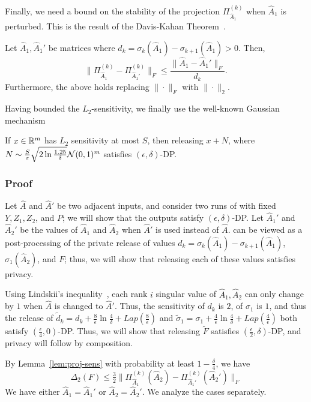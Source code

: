 Finally, we need a bound on the stability of the projection $\Pi_{\hat{A}_1}^{(k)}$ when $\hat{A}_1$ is perturbed. This is the result of the Davis-Kahan Theorem~\citep{bhatia1997}.
\begin{thm}\label{thm:davis-kahan}
Let $\hat{A}_1, \hat{A}_1'$ be matrices where $d_k= \sigma_k(\hat{A}_1) - \sigma_{k+1}(\hat{A}_1) > 0$. Then, 
\[
    \|\Pi_{\hat{A}_1}^{(k)} - \Pi_{\hat{A}_1'}^{(k)}\|_F \leq \frac{\|\hat{A}_1 - \hat{A}_1'\|_F}{d_k}.
\]
Furthermore, the above holds replacing $\|\cdot\|_F$ with $\|\cdot \|_2$.
\end{thm}

Having bounded the $L_2$-sensitivity, we finally use the well-known Gaussian mechanism~\citep{dwork2014algorithmic}
\begin{thm}\label{thm:gauss-mech}
    If $x \in \mathbb{R}^m$ has $L_2$ sensitivity at most $S$, then releasing $x + N$, where $N \sim \frac{S}{\varepsilon} \sqrt{2 \ln \frac{1.25}{\delta}}\mathcal{N}(0,1)^{m}$ satisfies $(\epsilon, \delta)$-DP.
\end{thm}

\subsubsection{Proof}
Let $\hat{A}$ and $\hat{A}'$ be two adjacent inputs, and consider two runs of \dpcom{} with fixed $Y,Z_1,Z_2$, and $P$; we will show that the outputs satisfy $(\epsilon, \delta)$-DP. Let $\hat{A}_1'$ and $\hat{A}_2'$ be the values of $\hat{A}_1$ and $\hat{A}_2$ when $\hat{A}'$ is used instead of $\hat{A}$. \dpcom{} can be viewed as a post-processing of the private release of values $d_k = \sigma_k(\hat{A}_1) - \sigma_{k+1}(\hat{A}_1)$, $\sigma_1(\hat{A}_2)$, and $F$; thus, we will show that releasing each of these values satisfies privacy.

Using Lindskii's inequality~\citep{bhatia1997}, each rank $i$ singular value of $\hat{A}_1, \hat{A}_2$ can only change by $1$ when $\hat{A}$ is changed to $\hat{A}'$. Thus, the sensitivity of $d_k$ is $2$, of $\sigma_1$ is $1$, and thus the release of $\tilde{d}_k = d_k + \frac{8}{\epsilon} \ln \frac{4}{\delta} + Lap(\frac{8}{\epsilon})$ and $\tilde{\sigma}_1 = \sigma_1 + \frac{4}{\epsilon} \ln \frac{4}{\delta} + Lap(\frac{4}{\epsilon})$ both satisfy $(\frac{\epsilon}{4}, 0)$-DP. Thus, we will show that releasing $\tilde{F}$ satisfies $(\frac \epsilon 2, \delta)$-DP, and privacy will follow by composition.

By Lemma~\ref{lem:proj-sens} with probability at least $1-\frac{\delta}{4}$, we have
\[
    \Delta_2(F) \leq \tfrac 3 2 \|\Pi_{\hat{A}_1}^{(k)}(\hat{A}_2) - \Pi_{\hat{A}_1'}^{(k)}(\hat{A}_2')\|_F
\]
We have either $\hat{A}_1 = \hat{A}_1'$ or $\hat{A}_2 = \hat{A}_2'$. We analyze the cases separately.

